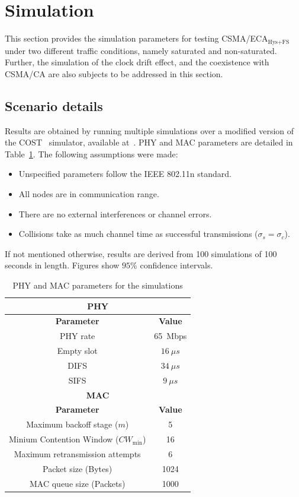 \documentclass[a4paper,journal]{IEEEtran}
\begin{document}
\section{Simulation}\label{simulations}
This section provides the simulation parameters for testing CSMA/ECA$_{\text{Hys+FS}}$ under two different traffic conditions, namely saturated and non-saturated. Further, the simulation of the clock drift effect, and the coexistence with CSMA/CA are also subjects to be addressed in this section.

	\subsection{Scenario details}
	Results are obtained by running multiple simulations over a modified version of the COST~\cite{COST} simulator, available at~\cite{sim:parameters}. PHY and MAC parameters are detailed in Table~\ref{tab:mac-params}. The following assumptions were made:
	
	\begin{itemize}
		\item Unspecified parameters follow the IEEE 802.11n standard.
		\item All nodes are in communication range.
		\item There are no external interferences or channel errors.
		\item Collisions take as much channel time as successful transmissions ($\sigma_{s}=\sigma_{c}$).
	\end{itemize}
	
	If not mentioned otherwise, results are derived from 100 simulations of 100 seconds in length. Figures show $95$\% confidence intervals.
	
	\begin{table}
		\centering
		\caption{PHY and MAC parameters for the simulations}
		\label{tab:mac-params}
		\begin{tabular}{|c|c|}
			\hline
			\multicolumn{2}{|c|}{{\bfseries PHY}}\\
			\hline
			{\bfseries Parameter} & {\bfseries Value}\\
			\hline
			PHY rate & 65~Mbps\\
			Empty slot & $16~\mu s$\\
			DIFS & $34~\mu s$\\
			SIFS & $9~\mu s$\\
			\hline
			\multicolumn{2}{|c|}{{\bfseries MAC}}\\
			\hline
			{\bfseries Parameter} & {\bfseries Value}\\
			\hline
			Maximum backoff stage ($m$) & 5\\
			Minium Contention Window ($CW_{\min}$) & 16\\
			Maximum retransmission attempts & 6\\
			Packet size (Bytes) & 1024\\
			MAC queue size (Packets) & 1000\\
			\hline
		\end{tabular}
	\end{table}
	
\end{document}
